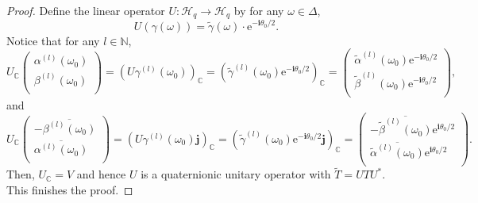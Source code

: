 \documentclass[10pt,a4paper]{amsart}
\begin{document}
\begin{proof}
Define the linear operator $U:\mathcal{H}_q\rightarrow\mathcal{H}_q$ by for any $\omega\in\Delta$,
\[
U(\gamma(\omega))=\widetilde{\gamma}(\omega)\cdot \mathrm{e}^{-\boldsymbol{i}\theta_0/2}.
\]
Notice that for any $l\in\mathbb{N}$,
\[
U_{\mathbb{C}}
\begin{pmatrix}
	\alpha^{(l)}(\omega_0) \\
	\beta^{(l)}(\omega_0) \\
\end{pmatrix}
=(U\gamma^{(l)}(\omega_0))_{\mathbb{C}}=(\widetilde{\gamma}^{(l)}(\omega_0)\mathrm{e}^{-\boldsymbol{i}\theta_0/2})_{\mathbb{C}}=\begin{pmatrix}
	\widetilde{\alpha}^{(l)}(\omega_0)\mathrm{e}^{-\boldsymbol{i}\theta_0/2} \\
	\widetilde{\beta}^{(l)}(\omega_0)\mathrm{e}^{-\boldsymbol{i}\theta_0/2} \\
\end{pmatrix},
\]
and
\[
U_{\mathbb{C}}
\begin{pmatrix}
	-\overline{\beta^{(l)}(\omega_0)} \\
	\overline{\alpha^{(l)}(\omega_0)} \\
\end{pmatrix}
=(U\gamma^{(l)}(\omega_0)\boldsymbol{j})_{\mathbb{C}}=(\widetilde{\gamma}^{(l)}(\omega_0)\mathrm{e}^{-\boldsymbol{i}\theta_0/2}\boldsymbol{j})_{\mathbb{C}}=\begin{pmatrix}
	-\overline{\widetilde{\beta}^{(l)}(\omega_0)}\mathrm{e}^{\boldsymbol{i}\theta_0/2} \\
	\overline{\widetilde{\alpha}^{(l)}(\omega_0)}\mathrm{e}^{\boldsymbol{i}\theta_0/2} \\
\end{pmatrix}.
\]
Then, $U_{\mathbb{C}}=V$ and hence $U$ is a quaternionic unitary operator with $\widetilde{T}=UTU^*$. This finishes the proof.
\end{proof}
\end{document}
